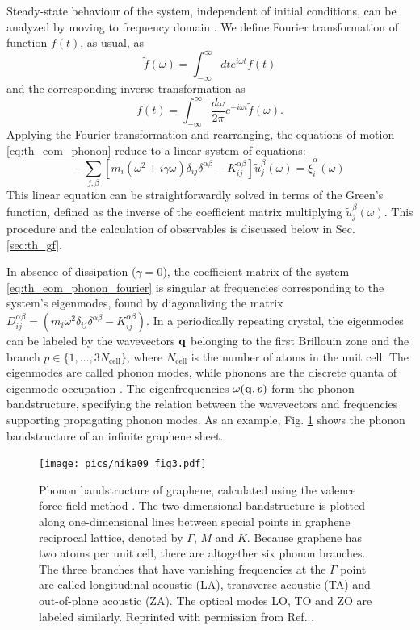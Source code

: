 Steady-state behaviour of the system, independent of initial conditions, can be analyzed by moving to frequency domain \cite{chaikin}. We define Fourier transformation of function $f(t)$, as usual, as
\begin{equation}
 \tilde f(\omega) = \int_{-\infty}^{\infty} dt e^{i\omega t} f(t)
\end{equation}
and the corresponding inverse transformation as
\begin{equation}
 f(t) = \int_{-\infty}^{\infty} \frac{d\omega}{2\pi} e^{-i\omega t}\tilde f(\omega).
\end{equation}
Applying the Fourier transformation and rearranging, the equations of motion \eqref{eq:th_eom_phonon} reduce to a linear system of equations:
\begin{equation}
 - \sum_{j,\beta}  [m_i (\omega^2+i\gamma \omega) \delta_{ij}\delta^{\alpha\beta} - K_{ij}^{\alpha\beta}] \tilde{u}_j^{\beta}(\omega) = \tilde \xi_i^{\alpha}(\omega) \label{eq:th_eom_phonon_fourier}
\end{equation}
This linear equation can be straightforwardly solved in terms of the Green's function, defined as the inverse of the coefficient matrix multiplying $\tilde{u}_j^{\beta}(\omega)$. This procedure and the calculation of observables is discussed below in Sec. \ref{sec:th_gf}.

In absence of dissipation ($\gamma=0$), the coefficient matrix of the system \eqref{eq:th_eom_phonon_fourier} is singular at frequencies corresponding to the system's eigenmodes, found by diagonalizing the matrix $D_{ij}^{\alpha\beta} = (m_i\omega^2 \delta_{ij}\delta^{\alpha\beta}-K_{ij}^{\alpha\beta})$. In a periodically repeating crystal, the eigenmodes can be labeled by the wavevectors $\mathbf{q}$ belonging to the first Brillouin zone \cite{ziman} and the branch $p \in \{1,\dots,3N_{\textrm{cell}}\}$, where $N_{\textrm{cell}}$ is the number of atoms in the unit cell. The eigenmodes are called phonon modes, while phonons are the discrete quanta of eigenmode occupation \cite{ziman}. The eigenfrequencies $\omega(\mathbf{q},p)$ form the phonon bandstructure, specifying the relation between the wavevectors and frequencies supporting propagating phonon modes. As an example, Fig. \ref{fig:th_nika} shows the phonon bandstructure of an infinite graphene sheet.

\begin{figure}
\begin{center}
 \texttt{[image: pics/nika09\_fig3.pdf]}
 \caption{Phonon bandstructure of graphene, calculated using the valence force field method \cite{nika09}. The two-dimensional bandstructure is plotted along one-dimensional lines between special points in graphene reciprocal lattice, denoted by $\Gamma$, $M$ and $K$. Because graphene has two atoms per unit cell, there are altogether six phonon branches. The three branches that have vanishing frequencies at the $\Gamma$ point are called longitudinal acoustic (LA), transverse acoustic (TA) and out-of-plane acoustic (ZA). The optical modes LO, TO and ZO are labeled similarly. Reprinted with permission from Ref. \cite{nika09}.}
\label{fig:th_nika}
\end{center}
\end{figure} 

